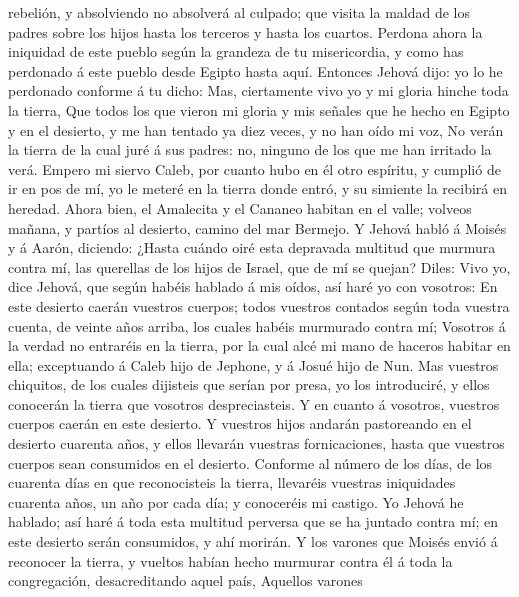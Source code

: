 rebelión, y absolviendo no absolverá al culpado; que visita la maldad de
los padres sobre los hijos hasta los terceros y hasta los cuartos.
 Perdona ahora la iniquidad de este pueblo según la
grandeza de tu misericordia, y como has perdonado á este pueblo desde
Egipto hasta aquí.  Entonces Jehová dijo: yo lo he
perdonado conforme á tu dicho:  Mas, ciertamente vivo yo y
mi gloria hinche toda la tierra,  Que todos los que vieron
mi gloria y mis señales que he hecho en Egipto y en el desierto, y me
han tentado ya diez veces, y no han oído mi voz,  No verán
la tierra de la cual juré á sus padres: no, ninguno de los que me han
irritado la verá.  Empero mi siervo Caleb, por cuanto hubo
en él otro espíritu, y cumplió de ir en pos de mí, yo le meteré en la
tierra donde entró, y su simiente la recibirá en heredad. 
Ahora bien, el Amalecita y el Cananeo habitan en el valle; volveos
mañana, y partíos al desierto, camino del mar Bermejo.  Y
Jehová habló á Moisés y á Aarón, diciendo:  ¿Hasta cuándo
oiré esta depravada multitud que murmura contra mí, las querellas de los
hijos de Israel, que de mí se quejan?  Diles: Vivo yo, dice
Jehová, que según habéis hablado á mis oídos, así haré yo con vosotros:
 En este desierto caerán vuestros cuerpos; todos vuestros
contados según toda vuestra cuenta, de veinte años arriba, los cuales
habéis murmurado contra mí;  Vosotros á la verdad no
entraréis en la tierra, por la cual alcé mi mano de haceros habitar en
ella; exceptuando á Caleb hijo de Jephone, y á Josué hijo de Nun.
 Mas vuestros chiquitos, de los cuales dijisteis que serían
por presa, yo los introduciré, y ellos conocerán la tierra que vosotros
despreciasteis.  Y en cuanto á vosotros, vuestros cuerpos
caerán en este desierto.  Y vuestros hijos andarán
pastoreando en el desierto cuarenta años, y ellos llevarán vuestras
fornicaciones, hasta que vuestros cuerpos sean consumidos en el
desierto.  Conforme al número de los días, de los cuarenta
días en que reconocisteis la tierra, llevaréis vuestras iniquidades
cuarenta años, un año por cada día; y conoceréis mi castigo.
 Yo Jehová he hablado; así haré á toda esta multitud
perversa que se ha juntado contra mí; en este desierto serán consumidos,
y ahí morirán.  Y los varones que Moisés envió á reconocer
la tierra, y vueltos habían hecho murmurar contra él á toda la
congregación, desacreditando aquel país,  Aquellos varones
